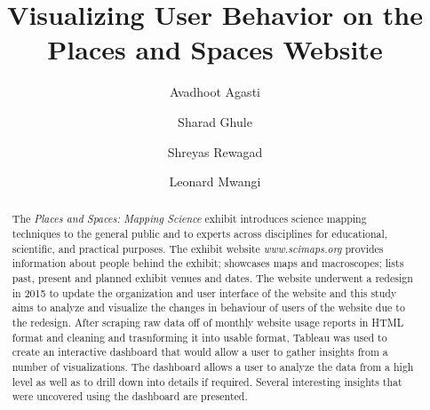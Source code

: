\documentclass[sigconf]{acmart}
\begin{document}
\title{Visualizing User Behavior on the Places and Spaces Website}

\author{Avadhoot Agasti}

\author{Sharad Ghule}

\author{Shreyas Rewagad}

\author{Leonard Mwangi}


\begin{abstract}

The \textit{Places and Spaces: Mapping Science} exhibit introduces science mapping techniques to the general public and to experts across disciplines for educational, scientific, and practical purposes. The exhibit website \textit{www.scimaps.org} provides information about people behind the exhibit; showcases maps and macroscopes; lists past, present and planned exhibit venues and dates. The website underwent a redesign in 2015 to update the organization and user interface of the website and this study aims to analyze and visualize the changes in behaviour of users of the website due to the redesign. After scraping raw data off of monthly website usage reports in HTML format and cleaning and trasnforming it into usable format, Tableau was used to create an interactive dashboard that would allow a user to gather insights from a number of visualizations. The dashboard allows a user to analyze the data from a high level as well as to drill down into details if required. Several interesting insights that were uncovered using the dashboard are presented.
\end{abstract}



\maketitle













\end{document}
